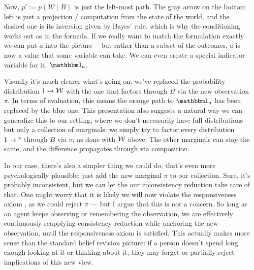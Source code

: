 \documentclass{article}
\begin{document}
	Now, $p' := p(\mathcal W \mid B)$ is just the left-most path. The gray arrow on the bottom left is just a projection / computation from the state of the world, and the dashed one is its inversion given by Bayes' rule, which is why the conditioning works out as in the formula. If we really want to match the formulation exactly we can put $a$ into the picture--- but rather than a subset of the outcomes, $a$ is now a value that some variable can take. We can even create a special indicator variable for it, $\mathbbm 1_a$.
	
	
	\begin{center}
	\end{center}

	Visually it's much clearer what's going on: we've replaced the probability distribution $1 \to \cal W$ with the one that factors through $B$ via the new observation $\pi$. In terms of evaluation, this means the orange path to $\mathbbm 1_a$ has been replaced by the blue one.
	This presentation also suggests a natural way we can generalize this to our setting, where we don't necessarily have full distributions but only a collection of marginals: we simply try to factor every distribution $1 \to *$ through $B$ via $\pi$, as done with $\cal W$ above. The other marginals can stay the same, and the difference propagates through via composition.
	
	In our case, there's also a simpler thing we could do, that's even more psychologically plausible: just add the new marginal $\pi$ to our collection. Sure, it's probably inconsistent, but we can let the our inconsistency reduction take care of that. One might worry that it is likely we will now violate the responsiveness axiom \cite{dietrich2016belief}, as we could reject $\pi$ --- but I argue that this is not a concern. So long as an agent keeps observing or remembering the observation, we are effectively continuously reapplying consistency reduction while anchoring the new observation, until the responsiveness axiom is satisfied. This actually makes more sense than the standard belief revision picture: if a person doesn't spend long enough looking at it or thinking about it, they may forget or partially reject implications of this new view.
	
\end{document}
